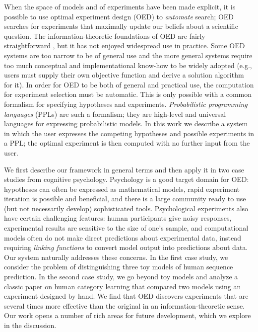 \documentclass{article}
\begin{document}

When the space of models and of experiments have been made explicit, it is possible to use optimal experiment design (OED) to \emph{automate} search; OED searches for experiments that maximally update our beliefs about a scientific question.
The information-theoretic foundations of OED are fairly straightforward \cite{Lindley1956}, but it has not enjoyed widespread use in practice.
Some OED systems are too narrow to be of general use and the more general systems require too much conceptual and implementational know-how to be widely adopted (e.g., users must supply their own objective function and derive a solution algorithm for it).
In order for OED to be both of general and practical use, the computation for experiment selection must be automatic.
This is only possible with a common formalism for specifying hypotheses and experiments.
\emph{Probabilistic programming languages} (PPLs) are such a formalism; they are high-level and universal languages for expressing probabilistic models.
In this work we describe a system in which the user expresses the competing hypotheses and possible experiments in a PPL; the optimal experiment is then computed with no further input from the user.

We first describe our framework in general terms and then apply it in two case studies from cognitive psychology.
Psychology is a good target domain for OED: hypotheses can often be expressed as mathematical models, rapid experiment iteration is possible and beneficial, and there is a large community ready to use (but not necessarily develop) sophisticated tools.
Psychological experiments also have certain challenging features: human participants give noisy responses, experimental results are sensitive to the size of one's sample, and computational models often do not make direct predictions about experimental data, instead requiring \emph{linking functions} to convert model output into predictions about data.
Our system naturally addresses these concerns.
In the first case study, we consider the problem of distinguishing three toy models of human sequence prediction.
In the second case study, we go beyond toy models and analyze a classic paper on human category learning that compared two models using an experiment designed by hand.
We find that OED discovers experiments that are several times more effective than the original in an information-theoretic sense.
Our work opens a number of rich areas for future development, which we explore in the discussion.
\end{document}
